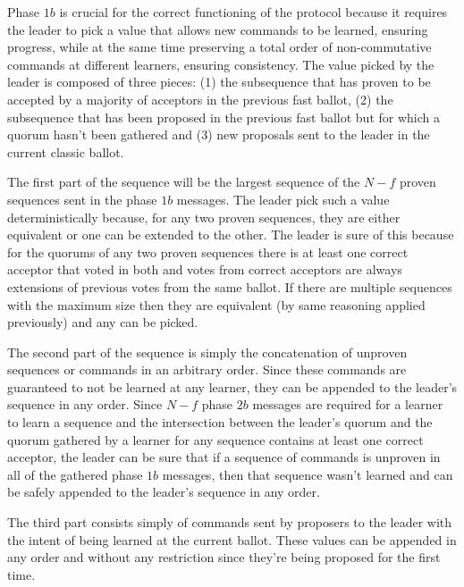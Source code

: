  Phase $1b$ is crucial for the correct functioning of the protocol because it requires the leader to pick a value that allows new commands to be learned, ensuring progress, while at the same time preserving a total order of non-commutative commands at different learners, ensuring consistency. The value picked by the leader is composed of three pieces: (1) the subsequence that has proven to be accepted by a majority of acceptors in the previous fast ballot, (2) the subsequence that has been proposed in the previous fast ballot but for which a quorum hasn't been gathered and (3) new proposals sent to the leader in the current classic ballot. \par
The first part of the sequence will be the largest sequence of the $N-f$ proven sequences sent in the phase $1b$ messages. The leader pick such a value deterministically because, for any two proven sequences, they are either equivalent or one can be extended to the other. The leader is sure of this because for the quorums of any two proven sequences there is at least one correct acceptor that voted in both and votes from correct acceptors are always extensions of previous votes from the same ballot. If there are multiple sequences with the maximum size then they are equivalent (by same reasoning applied previously) and any can be picked. \par
The second part of the sequence is simply the concatenation of unproven sequences or commands in an arbitrary order. Since these commands are guaranteed to not be learned at any learner, they can be appended to the leader's sequence in any order. Since $N-f$ phase $2b$ messages are required for a learner to learn a sequence and the intersection between the leader's quorum and the quorum gathered by a learner for any sequence contains at least one correct acceptor, the leader can be sure that if a sequence of commands is unproven in all of the gathered phase $1b$ messages, then that sequence wasn't learned and can be safely appended to the leader's sequence in any order. \par 
The third part consists simply of commands sent by proposers to the leader with the intent of being learned at the current ballot. These values can be appended in any order and without any restriction since they're being proposed for the first time.

